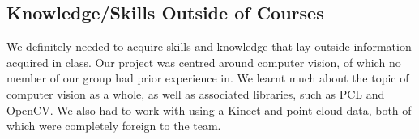 \documentclass{article}
\begin{document}
\subsection{Knowledge/Skills Outside of Courses}

We definitely needed to acquire skills and knowledge that lay outside information acquired in class. Our project was 
centred around computer vision, of which no member of our group had prior experience in. We learnt much about the topic of computer
vision as a whole, as well as associated libraries, such as PCL and OpenCV. We also had to work with using a Kinect and point cloud data, both 
of which were completely foreign to the team. 
\end{document}
